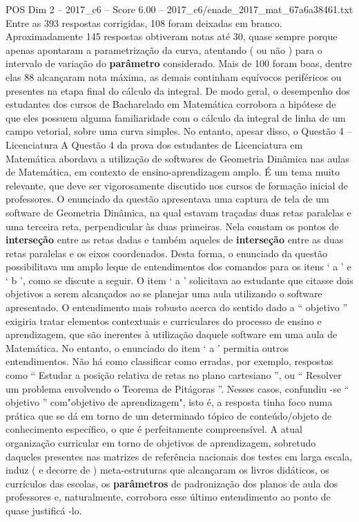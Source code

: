 \begin{textsample}{POS Dim 2 – 2017\_c6 – Score 6.00 – 2017\_c6/enade\_2017\_mat\_67a6a38461.txt}
Entre as 393 respostas corrigidas, 108 foram deixadas em branco.
Aproximadamente 145 respostas obtiveram notas até 30, quase sempre porque apenas apontaram a parametrização da curva, atentando ( ou não ) para o intervalo de variação do \textbf{parâmetro} considerado.
Mais de 100 foram boas, dentre elas 88 alcançaram nota máxima, as demais continham equívocos periféricos ou presentes na etapa final do cálculo da integral.
De modo geral, o desempenho dos estudantes dos cursos de Bacharelado em Matemática corrobora a hipótese de que eles possuem alguma familiaridade com o cálculo da integral de linha de um campo vetorial, sobre uma curva simples.
No entanto, apesar disso, o Questão 4 – Licenciatura A Questão 4 da prova dos estudantes de Licenciatura em Matemática abordava a utilização de softwares de Geometria Dinâmica nas aulas de Matemática, em contexto de ensino-aprendizagem amplo.
É um tema muito relevante, que deve ser vigorosamente discutido nos cursos de formação inicial de professores.
O enunciado da questão apresentava uma captura de tela de um software de Geometria Dinâmica, na qual estavam traçadas duas retas paralelas e uma terceira reta, perpendicular às duas primeiras.
Nela constam os pontos de \textbf{interseção} entre as retas dadas e também aqueles de \textbf{interseção} entre as duas retas paralelas e os eixos coordenados.
Desta forma, o enunciado da questão possibilitava um amplo leque de entendimentos dos comandos para os itens ‘ a ’ e ‘ b ’, como se discute a seguir.
O item ‘ a ’ solicitava ao estudante que citasse dois objetivos a serem alcançados ao se planejar uma aula utilizando o software apresentado.
O entendimento mais robusto acerca do sentido dado a “ objetivo ” exigiria tratar elementos contextuais e curriculares do processo de ensino e aprendizagem, que são inerentes à utilização daquele software em uma aula de Matemática.
No entanto, o enunciado do item ‘ a ’ permitia outros entendimentos.
Não há como classificar como erradas, por exemplo, respostas como “ Estudar a posição relativa de retas no plano cartesiano ”, ou “ Resolver um problema envolvendo o Teorema de Pitágoras ”.
Nesses casos, confundiu -se “ objetivo ” com"objetivo de aprendizagem", isto é, a resposta tinha foco numa prática que se dá em torno de um determinado tópico de conteúdo/objeto de conhecimento específico, o que é perfeitamente compreensível.
A atual organização curricular em torno de objetivos de aprendizagem, sobretudo daqueles presentes nas matrizes de referência nacionais dos testes em larga escala, induz ( e decorre de ) meta-estruturas que alcançaram os livros didáticos, os currículos das escolas, os \textbf{parâmetros} de padronização dos planos de aula dos professores e, naturalmente, corrobora esse último entendimento ao ponto de quase justificá -lo.

\end{textsample}
